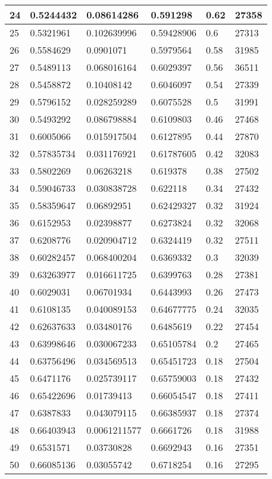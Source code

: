 \begin{longtable}{|l|l|l|l|l|l|}
24 & 0.5244432 & 0.08614286 & 0.591298 & 0.62 & 27358 \\ \hline 
25 & 0.5321961 & 0.102639996 & 0.59428906 & 0.6 & 27313 \\ \hline 
26 & 0.5584629 & 0.0901071 & 0.5979564 & 0.58 & 31985 \\ \hline 
27 & 0.5489113 & 0.068016164 & 0.6029397 & 0.56 & 36511 \\ \hline 
28 & 0.5458872 & 0.10408142 & 0.6046097 & 0.54 & 27339 \\ \hline 
29 & 0.5796152 & 0.028259289 & 0.6075528 & 0.5 & 31991 \\ \hline 
30 & 0.5493292 & 0.086798884 & 0.6109803 & 0.46 & 27468 \\ \hline 
31 & 0.6005066 & 0.015917504 & 0.6127895 & 0.44 & 27870 \\ \hline 
32 & 0.57835734 & 0.031176921 & 0.61787605 & 0.42 & 32083 \\ \hline 
33 & 0.5802269 & 0.06263218 & 0.619378 & 0.38 & 27502 \\ \hline 
34 & 0.59046733 & 0.030838728 & 0.622118 & 0.34 & 27432 \\ \hline 
35 & 0.58359647 & 0.06892951 & 0.62429327 & 0.32 & 31924 \\ \hline 
36 & 0.6152953 & 0.02398877 & 0.6273824 & 0.32 & 32068 \\ \hline 
37 & 0.6208776 & 0.020904712 & 0.6324419 & 0.32 & 27511 \\ \hline 
38 & 0.60282457 & 0.068400204 & 0.6369332 & 0.3 & 32039 \\ \hline 
39 & 0.63263977 & 0.016611725 & 0.6399763 & 0.28 & 27381 \\ \hline 
40 & 0.6029031 & 0.06701934 & 0.6443993 & 0.26 & 27473 \\ \hline 
41 & 0.6108135 & 0.040089153 & 0.64677775 & 0.24 & 32035 \\ \hline 
42 & 0.62637633 & 0.03480176 & 0.6485619 & 0.22 & 27454 \\ \hline 
43 & 0.63998646 & 0.030067233 & 0.65105784 & 0.2 & 27465 \\ \hline 
44 & 0.63756496 & 0.034569513 & 0.65451723 & 0.18 & 27504 \\ \hline 
45 & 0.6471176 & 0.025739117 & 0.65759003 & 0.18 & 27432 \\ \hline 
46 & 0.65422696 & 0.01739413 & 0.66054547 & 0.18 & 27411 \\ \hline 
47 & 0.6387833 & 0.043079115 & 0.66385937 & 0.18 & 27374 \\ \hline 
48 & 0.66403943 & 0.0061211577 & 0.6661726 & 0.18 & 31988 \\ \hline 
49 & 0.6531571 & 0.03730828 & 0.6692943 & 0.16 & 27351 \\ \hline 
50 & 0.66085136 & 0.03055742 & 0.6718254 & 0.16 & 27295 \\ \hline 
\end{longtable}